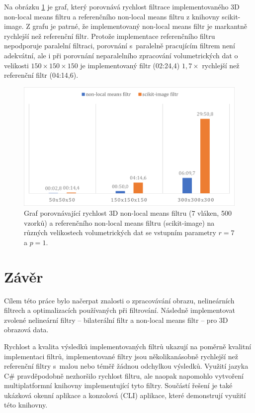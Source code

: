 Na obrázku \ref{fig:results:3dnlm} je graf, který porovnává rychlost filtrace implementovaného 3D non-local means filtru a referenčního non-local means filtru z knihovny scikit-image. Z grafu je patrné, že implementovaný non-local means filtr je markantně rychlejší než referenční filtr. Protože implementace referenčního filtru nepodporuje paralelní filtraci, porovnání s~paralelně pracujícím filtrem není adekvátní, ale i při porovnání neparalelního zpracování volumetrických dat o velikosti $150\times150\times150$ je implementovaný filtr (02:24,4) $1,7\times$ rychlejší než referenční filtr (04:14,6).

\begin{figure} [H]
    \centering
    \label{fig:results:3dnlm}
    \includegraphics[width=1\textwidth]{figures/3dnlm.pdf}
    \caption{Graf porovnávající rychlost 3D non-local means filtru (7 vláken, 500 vzorků) a referenčního non-local means filtru (scikit-image) na různých velikostech volumetrických dat se vstupním parametry $r=7$ a $p=1$.}
\end{figure}

\chapter{Závěr}
\label{chap:conclusion}
Cílem této práce bylo načerpat znalosti o zpracovávání obrazu, nelineárních filtrech a optimalizacích používaných při filtrování. Následně implementovat zvolené nelineární filtry -- bilaterální filtr a non-local means filtr -- pro 3D obrazová data.

Rychlost a kvalita výsledků implementovaných filtrů ukazují na poměrně kvalitní implementaci filtrů, implementované filtry jsou několikanásobně rychlejší než referenční filtry s~malou nebo téměř žádnou odchylkou výsledků. Využití jazyka C\# pravděpodobně nezhoršilo rychlost filtru, ale naopak napomohlo vytvoření multiplatformní knihovny implementující tyto filtry. Součástí řešení je také ukázková okenní aplikace a konzolová (CLI) aplikace, které demonstrují využití této knihovny. 

